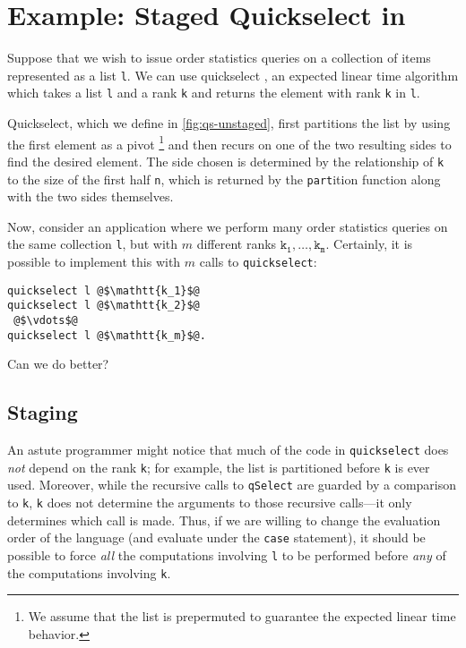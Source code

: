 
\section {Example: Staged Quickselect in \texorpdfstring{\lang}{λ12}}
\label{sec:example}

\begin{abstrsyn}



Suppose that we wish to issue order statistics queries on a collection of items
represented as a list \texttt{l}. We can use quickselect \cite{Hoare:1961}, an
expected linear time algorithm which takes a list \texttt{l} and a rank
\texttt{k} and returns the element with rank \texttt{k} in \texttt{l}.

Quickselect, which we define in \ref{fig:qs-unstaged}, first partitions the list
by using the first element as a pivot%
\footnote{We assume that the list is prepermuted to guarantee the expected
linear time behavior.}
and then recurs on one of the two resulting sides to find the desired element.
The side chosen is determined by the relationship of \texttt{k} to the size of
the first half \texttt{n}, which is returned by the \texttt{part}ition function
along with the two sides themselves.

Now, consider an application where we perform many order statistics queries on
the same collection \texttt{l}, but with $m$ different ranks
$\mathtt{k_1},\dots,\mathtt{k_m}$.
Certainly, it is possible to implement this with $m$ calls to
\texttt{quickselect}:
%
\begin{lstlisting}
quickselect l @$\mathtt{k_1}$@
quickselect l @$\mathtt{k_2}$@
 @$\vdots$@ 
quickselect l @$\mathtt{k_m}$@.
\end{lstlisting}
%
Can we do better?

\subsection{Staging}




An astute programmer might notice that much of the code in \texttt{quickselect}
does \emph{not} depend on the rank \texttt{k}; for example, the list is
partitioned before \texttt{k} is ever used. Moreover, while the recursive calls
to \texttt{qSelect} are guarded by a comparison to \texttt{k}, \texttt{k} does
not determine the arguments to those recursive calls---it only determines which
call is made. Thus, if we are willing to change the evaluation order of the
language (and evaluate under the \texttt{case} statement), it should be possible
to force \emph{all} the computations involving \texttt{l} to be performed before
\emph{any} of the computations involving \texttt{k}.


\end{abstrsyn}
